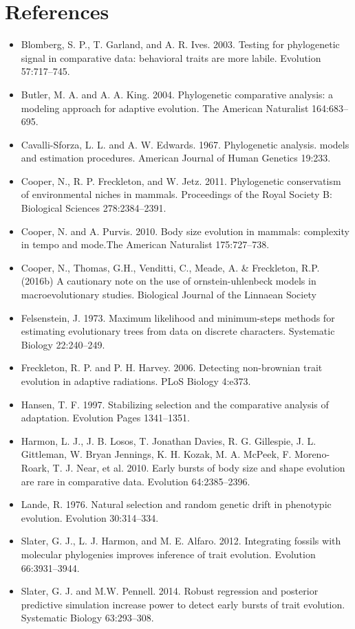 \documentclass[]{book}
\providecommand{\tightlist}{%
  \setlength{\itemsep}{0pt}\setlength{\parskip}{0pt}}
\begin{document}
\section{References}\label{references-3}

\begin{itemize}
\tightlist
\item
  Blomberg, S. P., T. Garland, and A. R. Ives. 2003. Testing for
  phylogenetic signal in comparative data: behavioral traits are more
  labile. Evolution 57:717--745.
\item
  Butler, M. A. and A. A. King. 2004. Phylogenetic comparative analysis:
  a modeling approach for adaptive evolution. The American Naturalist
  164:683--695.
\item
  Cavalli-Sforza, L. L. and A. W. Edwards. 1967. Phylogenetic analysis.
  models and estimation procedures. American Journal of Human Genetics
  19:233.
\item
  Cooper, N., R. P. Freckleton, and W. Jetz. 2011. Phylogenetic
  conservatism of environmental niches in mammals. Proceedings of the
  Royal Society B: Biological Sciences 278:2384--2391.
\item
  Cooper, N. and A. Purvis. 2010. Body size evolution in mammals:
  complexity in tempo and mode.The American Naturalist 175:727--738.
\item
  Cooper, N., Thomas, G.H., Venditti, C., Meade, A. \& Freckleton, R.P.
  (2016b) A cautionary note on the use of ornstein-uhlenbeck models in
  macroevolutionary studies. Biological Journal of the Linnaean Society
\item
  Felsenstein, J. 1973. Maximum likelihood and minimum-steps methods for
  estimating evolutionary trees from data on discrete characters.
  Systematic Biology 22:240--249.
\item
  Freckleton, R. P. and P. H. Harvey. 2006. Detecting non-brownian trait
  evolution in adaptive radiations. PLoS Biology 4:e373.
\item
  Hansen, T. F. 1997. Stabilizing selection and the comparative analysis
  of adaptation. Evolution Pages 1341--1351.
\item
  Harmon, L. J., J. B. Losos, T. Jonathan Davies, R. G. Gillespie, J. L.
  Gittleman, W. Bryan Jennings, K. H. Kozak, M. A. McPeek, F.
  Moreno-Roark, T. J. Near, et al. 2010. Early bursts of body size and
  shape evolution are rare in comparative data. Evolution 64:2385--2396.
\item
  Lande, R. 1976. Natural selection and random genetic drift in
  phenotypic evolution. Evolution 30:314--334.
\item
  Slater, G. J., L. J. Harmon, and M. E. Alfaro. 2012. Integrating
  fossils with molecular phylogenies improves inference of trait
  evolution. Evolution 66:3931--3944.
\item
  Slater, G. J. and M.W. Pennell. 2014. Robust regression and posterior
  predictive simulation increase power to detect early bursts of trait
  evolution. Systematic Biology 63:293--308.
\end{itemize}
\end{document}
